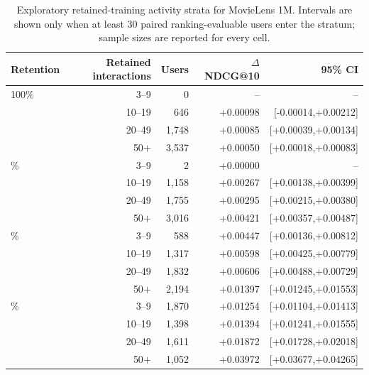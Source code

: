 \begin{table}[H]
\centering
\caption{Exploratory retained-training activity strata for MovieLens 1M. Intervals are shown only when at least 30 paired ranking-evaluable users enter the stratum; sample sizes are reported for every cell.}
\label{tab:supp-activity-movielens-1m}
\small
\begin{tabular}{@{}lrrrr@{}}
\toprule
Retention & Retained interactions & Users & $\Delta$ NDCG@10 & 95\% CI \\
\midrule
100\% & 3--9 & 0 & -- & -- \\
 & 10--19 & 646 & +0.00098 & [-0.00014,+0.00212] \\
 & 20--49 & 1,748 & +0.00085 & [+0.00039,+0.00134] \\
 & 50$+$ & 3,537 & +0.00050 & [+0.00018,+0.00083] \\
\addlinespace
75\% & 3--9 & 2 & +0.00000 & -- \\
 & 10--19 & 1,158 & +0.00267 & [+0.00138,+0.00399] \\
 & 20--49 & 1,755 & +0.00295 & [+0.00215,+0.00380] \\
 & 50$+$ & 3,016 & +0.00421 & [+0.00357,+0.00487] \\
\addlinespace
50\% & 3--9 & 588 & +0.00447 & [+0.00136,+0.00812] \\
 & 10--19 & 1,317 & +0.00598 & [+0.00425,+0.00779] \\
 & 20--49 & 1,832 & +0.00606 & [+0.00488,+0.00729] \\
 & 50$+$ & 2,194 & +0.01397 & [+0.01245,+0.01553] \\
\addlinespace
25\% & 3--9 & 1,870 & +0.01254 & [+0.01104,+0.01413] \\
 & 10--19 & 1,398 & +0.01394 & [+0.01241,+0.01555] \\
 & 20--49 & 1,611 & +0.01872 & [+0.01728,+0.02018] \\
 & 50$+$ & 1,052 & +0.03972 & [+0.03677,+0.04265] \\
\bottomrule
\end{tabular}
\end{table}
